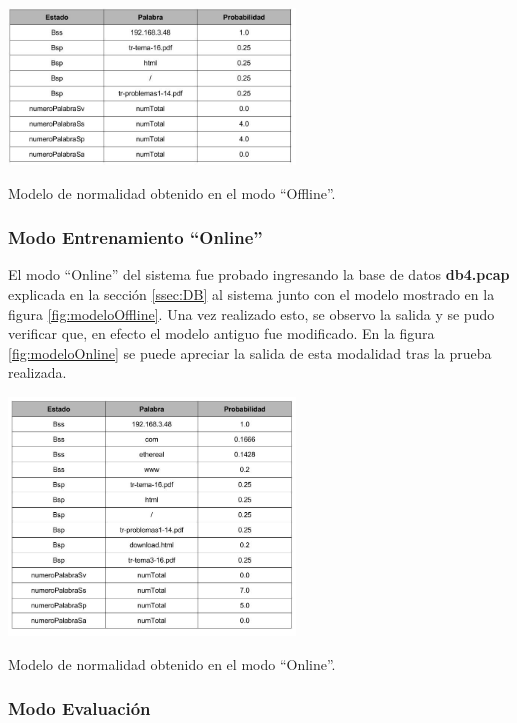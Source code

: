 \begin{table}[!htb]
\begin{center}
\includegraphics[width=3in]{./img/modeloOffline.jpg}
\caption{Modelo de normalidad obtenido en el modo ``Offline''.}
\label{fig:modeloOffline}
\end{center}
\end{table}

\subsubsection{Modo Entrenamiento ``Online''}

El modo ``Online'' del sistema fue probado ingresando la base de datos \textbf{db4.pcap} explicada en la sección \ref{ssec:DB} al sistema junto con el modelo mostrado en la figura \ref{fig:modeloOffline}. Una vez realizado esto, se observo la salida y se pudo verificar que, en efecto el modelo antiguo fue modificado. En la figura \ref{fig:modeloOnline} se puede apreciar la salida de esta modalidad tras la prueba realizada.

\begin{table}[!htb]
\begin{center}
\includegraphics[width=3in]{./img/modeloOnline.jpg}
\caption{Modelo de normalidad obtenido en el modo ``Online''.}
\label{fig:modeloOnline}
\end{center}
\end{table}

\subsubsection{Modo Evaluación}

